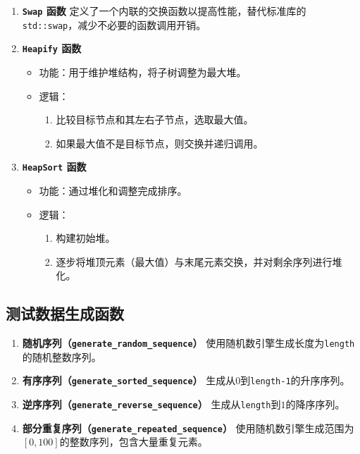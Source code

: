 \documentclass{ctexart}
\begin{document}
\begin{enumerate}
    \item \textbf{\texttt{Swap} 函数}  
    定义了一个内联的交换函数以提高性能，替代标准库的\texttt{std::swap}，减少不必要的函数调用开销。

    \item \textbf{\texttt{Heapify} 函数}  
    \begin{itemize}
        \item 功能：用于维护堆结构，将子树调整为最大堆。
        \item 逻辑：
        \begin{enumerate}
            \item 比较目标节点和其左右子节点，选取最大值。
            \item 如果最大值不是目标节点，则交换并递归调用。
        \end{enumerate}
    \end{itemize}

    \item \textbf{\texttt{HeapSort} 函数}  
    \begin{itemize}
        \item 功能：通过堆化和调整完成排序。
        \item 逻辑：
        \begin{enumerate}
            \item 构建初始堆。
            \item 逐步将堆顶元素（最大值）与末尾元素交换，并对剩余序列进行堆化。
        \end{enumerate}
    \end{itemize}
\end{enumerate}

\subsection{测试数据生成函数}

\begin{enumerate}
    \item \textbf{随机序列（\texttt{generate\_random\_sequence}）}  
    使用随机数引擎生成长度为\texttt{length}的随机整数序列。

    \item \textbf{有序序列（\texttt{generate\_sorted\_sequence}）}  
    生成从$0$到\texttt{length-1}的升序序列。

    \item \textbf{逆序序列（\texttt{generate\_reverse\_sequence}）}  
    生成从\texttt{length}到$1$的降序序列。

    \item \textbf{部分重复序列（\texttt{generate\_repeated\_sequence}）}  
    使用随机数引擎生成范围为$[0, 100]$的整数序列，包含大量重复元素。
\end{enumerate}
\end{document}
